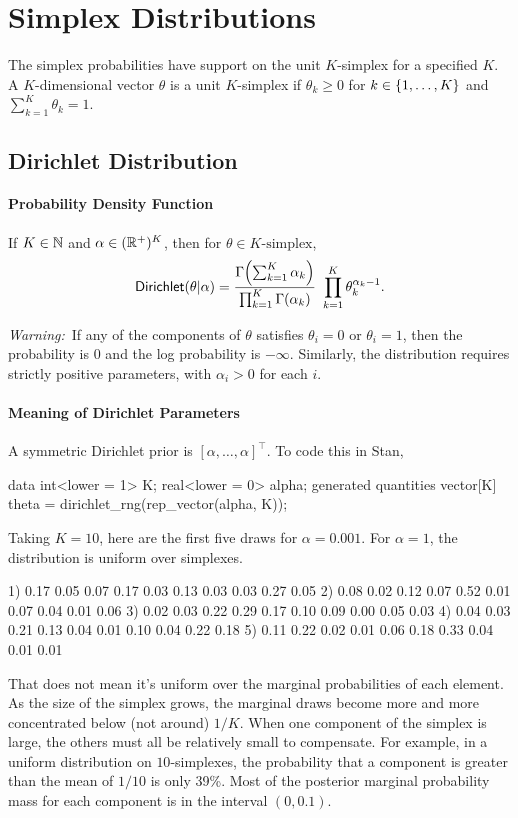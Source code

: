 \chapter{Simplex Distributions}

\noindent
The simplex probabilities have support on the unit $K$-simplex for a
specified $K$.  A $K$-dimensional vector $\theta$ is a unit
$K$-simplex if $\theta_k \geq 0$ for $k \in \{ 1,\ldots,K \}$ and
$\sum_{k = 1}^K \theta_k = 1$.


\section{Dirichlet Distribution}

\subsubsection{Probability Density Function}

If $K \in \mathbb{N}$ and $\alpha \in (\mathbb{R}^+)^{K}$, then for
$\theta \in \mbox{$K$-simplex}$,
\[
\mbox{\sf Dirichlet}(\theta|\alpha)
=
\frac{\Gamma \! \left( \sum_{k=1}^K \alpha_k \right)}
     {\prod_{k=1}^K \Gamma(\alpha_k)}
\
\prod_{k=1}^K \theta_k^{\alpha_k - 1}
.
\]

{\it Warning:}\ If any of the components of $\theta$ satisfies
$\theta_i = 0$ or $\theta_i = 1$, then the probability is 0 and the log
probability is $-\infty$.  Similarly, the distribution requires
strictly positive parameters, with $\alpha_i > 0$ for each $i$.

\subsubsection{Meaning of Dirichlet Parameters}

A symmetric Dirichlet prior is $[\alpha, \ldots, \alpha]^{\top}$.  To
code this in Stan,

\begin{stancode}
data {
  int<lower = 1> K;
  real<lower = 0> alpha;
}
generated quantities {
  vector[K] theta = dirichlet_rng(rep_vector(alpha, K));
}
\end{stancode}

Taking $K = 10$, here are the first five draws for
$\alpha = 0.001$.
For $\alpha = 1$, the distribution is uniform over simplexes.
%
\begin{stancode}
1) 0.17 0.05 0.07 0.17 0.03 0.13 0.03 0.03 0.27 0.05
2) 0.08 0.02 0.12 0.07 0.52 0.01 0.07 0.04 0.01 0.06
3) 0.02 0.03 0.22 0.29 0.17 0.10 0.09 0.00 0.05 0.03
4) 0.04 0.03 0.21 0.13 0.04 0.01 0.10 0.04 0.22 0.18
5) 0.11 0.22 0.02 0.01 0.06 0.18 0.33 0.04 0.01 0.01
\end{stancode}
%
That does not mean it's uniform over the marginal probabilities of
each element.  As the size of the simplex grows, the marginal draws
become more and more concentrated below (not around) $1/K$.  When one
component of the simplex is large, the others must all be relatively
small to compensate.  For example, in a uniform distribution on
$10$-simplexes, the probability that a component is greater than the
mean of $1/10$ is only 39\%.  Most of the posterior marginal
probability mass for each component is in the interval $(0, 0.1)$.

